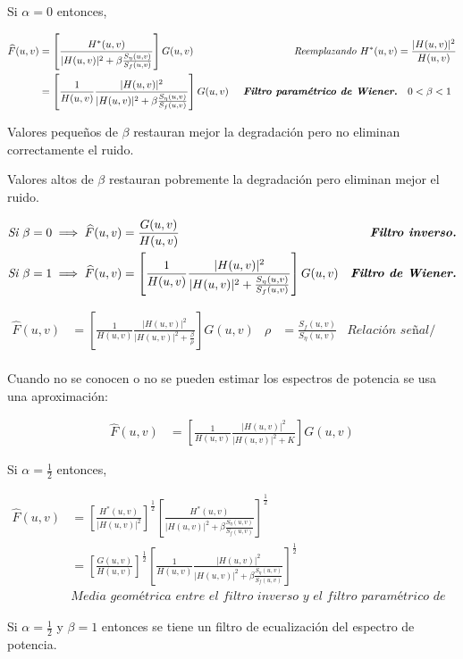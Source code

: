 \documentclass[a4paper,10pt,spanish]{article}
\begin{document}
Si $\alpha=0$ entonces,

\begin{align*}
\widehat{F}(u,v) &= \left[\frac{H^{*}(u,v)}{|H(u,v)|^{2}+\beta\frac{S_{\eta}(u,v)}{S_{f}(u,v)}}\right]G(u,v)
& \textit{Reemplazando }H^{*}(u,v) &= \frac{|H(u,v)|^{2}}{H(u,v)} \\
&= \left[\frac{1}{H(u,v)}\frac{|H(u,v)|^{2}}{|H(u,v)|^{2}+\beta\frac{S_{\eta}(u,v)}{S_{f}(u,v)}}\right]G(u,v)
& \textit{\textbf{ Filtro paramétrico de Wiener.}} & \quad 0<\beta<1 \\
\end{align*}

Valores pequeños de $\beta$ restauran mejor la degradación pero no eliminan correctamente el ruido.

Valores altos de $\beta$ restauran pobremente la degradación pero eliminan mejor el ruido.

\begin{align*}
\textit{Si }\beta=0 &\implies \widehat{F}(u,v) = \frac{G(u,v)}{H(u,v)} 
& \textit{\textbf{Filtro inverso.}} \\
\textit{Si }\beta=1 &\implies \widehat{F}(u,v) = \left[\frac{1}{H(u,v)}\frac{|H(u,v)|^{2}}{|H(u,v)|^{2}+\frac{S_{\eta}(u,v)}{S_{f}(u,v)}}\right]G(u,v)
& \textit{\textbf{Filtro de Wiener.}}
\end{align*}

\begin{align*}
\widehat{F}(u,v) &= \left[\frac{1}{H(u,v)}\frac{|H(u,v)|^{2}}{|H(u,v)|^{2}+\frac{\beta}{\rho}}\right]G(u,v) & \rho &= \frac{S_{f}(u,v)}{S_{\eta}(u,v)} & \textit{Relación señal/ruido.}
\end{align*} \\

Cuando no se conocen o no se pueden estimar los espectros de potencia se usa una aproximación:

\begin{align*}
\widehat{F}(u,v) &= \left[\frac{1}{H(u,v)}\frac{|H(u,v)|^{2}}{|H(u,v)|^{2}+K}\right]G(u,v)
\end{align*}

Si $\alpha=\frac{1}{2}$ entonces,

\begin{align*}
\widehat{F}(u,v) &= \left[\frac{H^{*}(u,v)}{|H(u,v)|^{2}}\right]^{\frac{1}{2}}
\left[\frac{H^{*}(u,v)}{|H(u,v)|^{2}+\beta\frac{S_{\eta}(u,v)}{S_{f}(u,v)}}\right]^{\frac{1}{2}} \\
&= \left[\frac{G(u,v)}{H(u,v)} \right]^{\frac{1}{2}}
\left[\frac{1}{H(u,v)}\frac{|H(u,v)|^{2}}{|H(u,v)|^{2}+\beta\frac{S_{\eta}(u,v)}{S_{f}(u,v)}}\right]^{\frac{1}{2}} \\
& \textit{Media geométrica entre el filtro inverso y el filtro paramétrico de Wiener.}
\end{align*}

Si $\alpha=\frac{1}{2}$ y $\beta=1$ entonces se tiene un filtro de ecualización del espectro de potencia.

\end{document}
